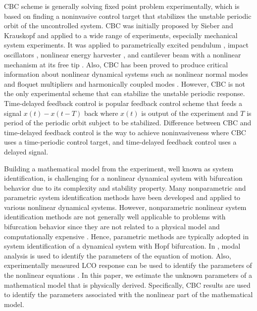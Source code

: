 \documentclass[openacc]{rsproca_new}%
\begin{document}
CBC scheme is generally solving fixed point problem experimentally, which is based on finding a noninvasive control target that stabilizes the unstable periodic orbit of the uncontrolled system. CBC was initially proposed by Sieber and Krauskopf \cite{sieber2008control} and applied to a wide range of experiments, especially mechanical system experiments. It was applied to parametrically excited pendulum \cite{sieber2011control}, impact oscillators \cite{bureau2013experimental,bureau2014experimental}, nonlinear energy harvester \cite{barton2013systematic,barton2011numerical}
, and cantilever beam with a nonlinear mechanism at its free tip \cite{renson2019application}. Also, CBC has been proved to produce critical information about nonlinear dynamical systems such as nonlinear normal modes \cite{renson2016robust,renson2016experimental} and floquet multipliers \cite{barton2017control} and harmonically coupled modes \cite{renson2019application}. However, CBC is not the only experimental scheme that can stabilize the unstable periodic response. Time-delayed feedback control \cite{pyragas2006delayed,sieber2016generic} is popular feedback control scheme that feeds a signal $x(t)-x(t-T)$ back where $x(t)$ is output of the experiment and $T$ is period of the periodic orbit subject to be stabilized. Difference between CBC and time-delayed feedback control is the way to achieve noninvasiveness where CBC uses a time-periodic control target, and time-delayed feedback control uses a delayed signal.

Building a mathematical model from the experiment, well known as system identification, is challenging for a nonlinear dynamical system with bifurcation behavior due to its complexity and stability property. Many nonparametric and parametric system identification methods have been developed and applied to various nonlinear dynamical systems. However, nonparametric nonlinear system identification methods are not generally well applicable to problems with bifurcation behavior since they are not related to a physical model and computationally expensive \cite{thothadri2005nonlinear}. Hence, parametric methods are typically adopted in system identification of a dynamical system with Hopf bifurcation. In \cite{fichera2014experimental}, modal analysis is used to identify the parameters of the equation of motion. Also, experimentally measured LCO response can be used to identify the parameters of the nonlinear equations \cite{abdelkefi2013analytical}. In this paper, we estimate the unknown parameters of a mathematical model that is physically derived. Specifically, CBC results are used to identify the parameters associated with the nonlinear part of the mathematical model.
\end{document}
